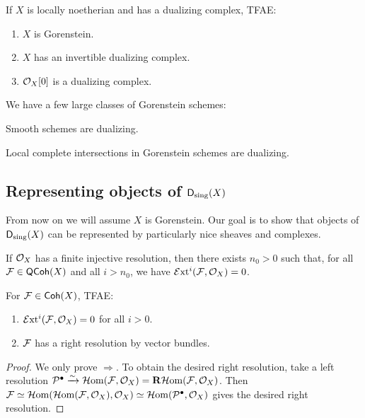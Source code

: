 \documentclass{article}
\begin{document}
\begin{thm}
	If $X$ is locally noetherian and has a dualizing complex, TFAE:
	\begin{enumerate}
		\item $X$ is Gorenstein.
		\item $X$ has an invertible dualizing complex.
		\item $\mathcal{O}_X[0]$ is a dualizing complex.
	\end{enumerate}
\end{thm}

We have a few large classes of Gorenstein schemes:

\begin{thm}
	Smooth schemes are dualizing.
\end{thm}

\begin{thm}
	Local complete intersections in Gorenstein schemes are dualizing.
\end{thm}


\subsection{Representing objects of $\mathsf{D}_{\mathrm{sing}}(X)$}

From now on we will assume $X$ is Gorenstein.
Our goal is to show that objects of $\mathsf{D}_{\mathrm{sing}}(X)$ can be represented by particularly nice sheaves and complexes.

\begin{prop}
	If $\mathcal{O}_X$ has a finite injective resolution, then there exists $n_0 > 0$ such that, for all $\mathcal{F} \in \mathsf{QCoh}(X)$ and all $i > n_0$, we have $\mathcal{E}\mkern-3mu\operatorname{xt}^i(\mathcal{F}, \mathcal{O}_X) = 0$.
\end{prop}

\begin{prop}
	For $\mathcal{F} \in \mathsf{Coh}(X)$, TFAE:
	\begin{enumerate}
		\item $\mathcal{E}\mkern-3mu\operatorname{xt}^i(\mathcal{F}, \mathcal{O}_X) = 0$ for all $i > 0$.
		\item $\mathcal{F}$ has a right resolution by vector bundles.
	\end{enumerate}
\end{prop}

\begin{proof}
	We only prove $\Rightarrow$.
	To obtain the desired right resolution, take a left resolution $\mathcal{P}^\bullet \xrightarrow{\sim} \mathcal{H}\mkern-3mu\operatorname{om}(\mathcal{F}, \mathcal{O}_X) = \mathbf{R} \mathcal{H}\mkern-3mu\operatorname{om}(\mathcal{F}, \mathcal{O}_X)$.
	Then $\mathcal{F} \simeq \mathcal{H}\mkern-3mu\operatorname{om}(\mathcal{H}\mkern-3mu\operatorname{om}(\mathcal{F}, \mathcal{O}_X), \mathcal{O}_X) \simeq \mathcal{H}\mkern-3mu\operatorname{om}(\mathcal{P}^\bullet, \mathcal{O}_X)$ gives the desired right resolution.
\end{proof}
\end{document}
